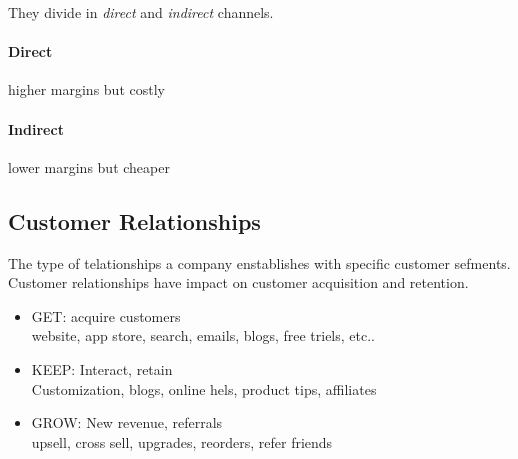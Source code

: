 \documentclass{article}
\begin{document}
They divide in \textit{direct} and \textit{indirect} channels.
\paragraph{Direct} higher margins but costly
\paragraph{Indirect} lower margins but cheaper

\subsection{Customer Relationships}
The type of telationships a company enstablishes with specific customer sefments. Customer relationships have impact on customer acquisition and retention.

\begin{itemize}
    \item GET: acquire customers \\
        website, app store, search, emails, blogs, free triels, etc..
    \item KEEP: Interact, retain \\
        Customization, blogs, online hels, product tips, affiliates
    \item GROW: New revenue, referrals \\
        upsell, cross sell, upgrades, reorders, refer friends
\end{itemize}
\end{document}
